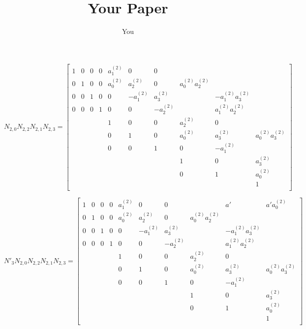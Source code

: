 \documentclass{article}
\title{Your Paper}
\author{You}
\begin{document}
\maketitle
\[
N_{2,0}N_{2,2}N_{2,1}N_{2,3}=
  \begin{bmatrix}
    1 & 0 & 0 & 0 & a_1^{(2)} & 0 & 0 &  &  &  \\
    0 & 1 & 0 & 0 & a_0^{(2)} & a_2^{(2)} & 0 & a_0^{(2)}a_2^{(2)} &  &  \\
    0 & 0 & 1 & 0 & 0 & -a_1^{(2)} & a_3^{(2)} &  & -a_1^{(2)}a_3^{(2)} &  \\
    0 & 0 & 0 & 1 & 0 & 0 & -a_2^{(2)} &  & a_1^{(2)}a_2^{(2)} &  \\
    & & & & 1 & 0 & 0 & a_2^{(2)} & 0 &  \\
    & & & & 0 & 1 & 0 & a_0^{(2)} & a_3^{(2)} & a_0^{(2)}a_3^{(2)}\\
    & & & & 0 & 0 & 1 & 0 & -a_1^{(2)} &  \\
    & & & & & & & 1 & 0 & a_3^{(2)} \\
    & & & & & & & 0 & 1 & a_0^{(2)} \\
    & & & & & & & & & 1 \\
  \end{bmatrix}
\]

\[
N'_3N_{2,0}N_{2,2}N_{2,1}N_{2,3}=
  \begin{bmatrix}
    1 & 0 & 0 & 0 & a_1^{(2)} & 0 & 0 &  & a' & a'a_0^{(2)} \\
    0 & 1 & 0 & 0 & a_0^{(2)} & a_2^{(2)} & 0 & a_0^{(2)}a_2^{(2)} &  &  \\
    0 & 0 & 1 & 0 & 0 & -a_1^{(2)} & a_3^{(2)} &  & -a_1^{(2)}a_3^{(2)} &  \\
    0 & 0 & 0 & 1 & 0 & 0 & -a_2^{(2)} &  & a_1^{(2)}a_2^{(2)} &  \\
    & & & & 1 & 0 & 0 & a_2^{(2)} & 0 &  \\
    & & & & 0 & 1 & 0 & a_0^{(2)} & a_3^{(2)} & a_0^{(2)}a_3^{(2)}\\
    & & & & 0 & 0 & 1 & 0 & -a_1^{(2)} &  \\
    & & & & & & & 1 & 0 & a_3^{(2)} \\
    & & & & & & & 0 & 1 & a_0^{(2)} \\
    & & & & & & & & & 1 \\
  \end{bmatrix}
\]
\end{document}
